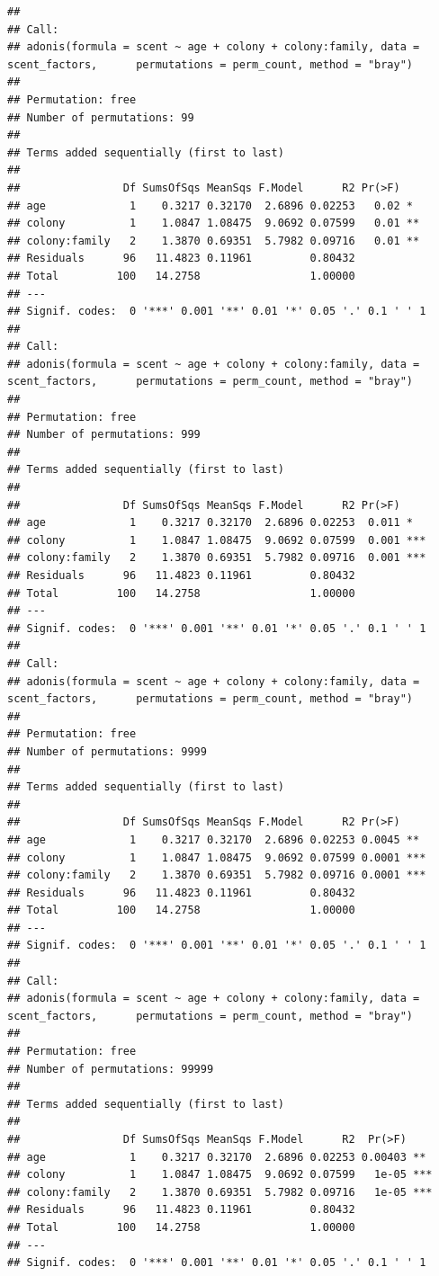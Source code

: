 \documentclass[]{article}
\begin{document}
\begin{verbatim}
## 
## Call:
## adonis(formula = scent ~ age + colony + colony:family, data = scent_factors,      permutations = perm_count, method = "bray") 
## 
## Permutation: free
## Number of permutations: 99
## 
## Terms added sequentially (first to last)
## 
##                Df SumsOfSqs MeanSqs F.Model      R2 Pr(>F)   
## age             1    0.3217 0.32170  2.6896 0.02253   0.02 * 
## colony          1    1.0847 1.08475  9.0692 0.07599   0.01 **
## colony:family   2    1.3870 0.69351  5.7982 0.09716   0.01 **
## Residuals      96   11.4823 0.11961         0.80432          
## Total         100   14.2758                 1.00000          
## ---
## Signif. codes:  0 '***' 0.001 '**' 0.01 '*' 0.05 '.' 0.1 ' ' 1
## 
## Call:
## adonis(formula = scent ~ age + colony + colony:family, data = scent_factors,      permutations = perm_count, method = "bray") 
## 
## Permutation: free
## Number of permutations: 999
## 
## Terms added sequentially (first to last)
## 
##                Df SumsOfSqs MeanSqs F.Model      R2 Pr(>F)    
## age             1    0.3217 0.32170  2.6896 0.02253  0.011 *  
## colony          1    1.0847 1.08475  9.0692 0.07599  0.001 ***
## colony:family   2    1.3870 0.69351  5.7982 0.09716  0.001 ***
## Residuals      96   11.4823 0.11961         0.80432           
## Total         100   14.2758                 1.00000           
## ---
## Signif. codes:  0 '***' 0.001 '**' 0.01 '*' 0.05 '.' 0.1 ' ' 1
## 
## Call:
## adonis(formula = scent ~ age + colony + colony:family, data = scent_factors,      permutations = perm_count, method = "bray") 
## 
## Permutation: free
## Number of permutations: 9999
## 
## Terms added sequentially (first to last)
## 
##                Df SumsOfSqs MeanSqs F.Model      R2 Pr(>F)    
## age             1    0.3217 0.32170  2.6896 0.02253 0.0045 ** 
## colony          1    1.0847 1.08475  9.0692 0.07599 0.0001 ***
## colony:family   2    1.3870 0.69351  5.7982 0.09716 0.0001 ***
## Residuals      96   11.4823 0.11961         0.80432           
## Total         100   14.2758                 1.00000           
## ---
## Signif. codes:  0 '***' 0.001 '**' 0.01 '*' 0.05 '.' 0.1 ' ' 1
## 
## Call:
## adonis(formula = scent ~ age + colony + colony:family, data = scent_factors,      permutations = perm_count, method = "bray") 
## 
## Permutation: free
## Number of permutations: 99999
## 
## Terms added sequentially (first to last)
## 
##                Df SumsOfSqs MeanSqs F.Model      R2  Pr(>F)    
## age             1    0.3217 0.32170  2.6896 0.02253 0.00403 ** 
## colony          1    1.0847 1.08475  9.0692 0.07599   1e-05 ***
## colony:family   2    1.3870 0.69351  5.7982 0.09716   1e-05 ***
## Residuals      96   11.4823 0.11961         0.80432            
## Total         100   14.2758                 1.00000            
## ---
## Signif. codes:  0 '***' 0.001 '**' 0.01 '*' 0.05 '.' 0.1 ' ' 1
\end{verbatim}
\end{document}
